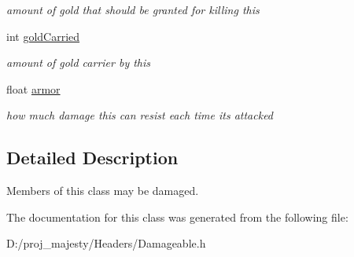 \begin{DoxyCompactItemize}
\begin{DoxyCompactList}\small\item\em amount of gold that should be granted for killing this \end{DoxyCompactList}\item 
int \hyperlink{class_damageable_ad5f2bf4daee7be1f1d673e0d5591dad0}{gold\+Carried}\hypertarget{class_damageable_ad5f2bf4daee7be1f1d673e0d5591dad0}{}\label{class_damageable_ad5f2bf4daee7be1f1d673e0d5591dad0}

\begin{DoxyCompactList}\small\item\em amount of gold carrier by this \end{DoxyCompactList}\item 
float \hyperlink{class_damageable_a7b4306631ce2d7dd8e50000b352940e4}{armor}\hypertarget{class_damageable_a7b4306631ce2d7dd8e50000b352940e4}{}\label{class_damageable_a7b4306631ce2d7dd8e50000b352940e4}

\begin{DoxyCompactList}\small\item\em how much damage this can resist each time it\textquotesingle{}s attacked \end{DoxyCompactList}\end{DoxyCompactItemize}


\subsection{Detailed Description}
Members of this class may be damaged. 

The documentation for this class was generated from the following file\+:\begin{DoxyCompactItemize}
\item 
D\+:/proj\+\_\+majesty/\+Headers/Damageable.\+h\end{DoxyCompactItemize}
